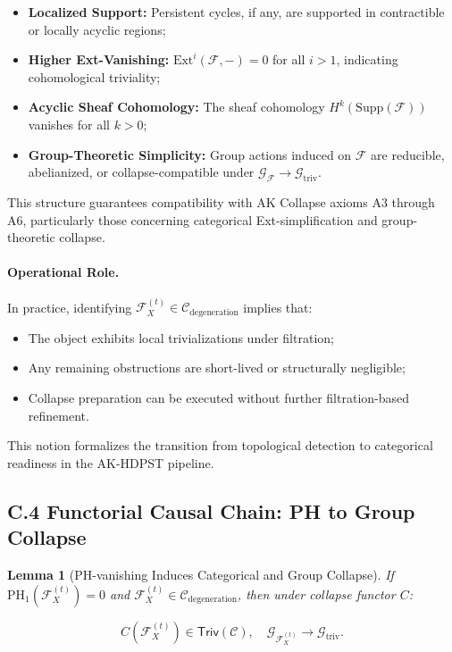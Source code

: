\documentclass[11pt]{article}
\newtheorem{lemma}[theorem]{Lemma}
\begin{document}
\begin{itemize}
    \item \textbf{Localized Support:} Persistent cycles, if any, are supported in contractible or locally acyclic regions;
    \item \textbf{Higher Ext-Vanishing:} \( \mathrm{Ext}^i(\mathcal{F}, -) = 0 \) for all \( i > 1 \), indicating cohomological triviality;
    \item \textbf{Acyclic Sheaf Cohomology:} The sheaf cohomology \( H^k(\mathrm{Supp}(\mathcal{F})) \) vanishes for all \( k > 0 \);
    \item \textbf{Group-Theoretic Simplicity:} Group actions induced on \( \mathcal{F} \) are reducible, abelianized, or collapse-compatible under \( \mathcal{G}_{\mathcal{F}} \to \mathcal{G}_{\mathrm{triv}} \).
\end{itemize}

This structure guarantees compatibility with AK Collapse axioms A3 through A6, particularly those concerning categorical Ext-simplification and group-theoretic collapse.

\paragraph{Operational Role.}  
In practice, identifying \( \mathcal{F}_X^{(t)} \in \mathcal{C}_{\mathrm{degeneration}} \) implies that:
\begin{itemize}
    \item The object exhibits local trivializations under filtration;
    \item Any remaining obstructions are short-lived or structurally negligible;
    \item Collapse preparation can be executed without further filtration-based refinement.
\end{itemize}

This notion formalizes the transition from topological detection to categorical readiness in the AK-HDPST pipeline.



\subsection*{C.4 Functorial Causal Chain: PH to Group Collapse}

\begin{lemma}[PH-vanishing Induces Categorical and Group Collapse]
If \( \mathrm{PH}_1(\mathcal{F}_X^{(t)}) = 0 \) and \( \mathcal{F}_X^{(t)} \in \mathcal{C}_{\mathrm{degeneration}} \), then under collapse functor \( C \):

\[
C(\mathcal{F}_X^{(t)}) \in \mathsf{Triv}(\mathcal{C}), \quad \mathcal{G}_{\mathcal{F}_X^{(t)}} \longrightarrow \mathcal{G}_{\mathrm{triv}}.
\]
\end{lemma}
\end{document}
